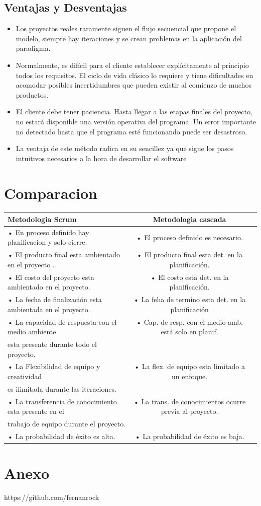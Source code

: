 \documentclass[10pt]{article}
\begin{document}
\subsection{Ventajas y Desventajas}
\begin{itemize}
\item 	Los proyectos reales raramente siguen el flujo secuencial que propone el modelo, siempre hay iteraciones y se crean problemas en la aplicación del paradigma.
\item 	Normalmente, es difícil para el cliente establecer explícitamente al principio  todos los requisitos. El ciclo de vida clásico lo requiere y tiene dificultades en acomodar posibles incertidumbres que pueden existir al comienzo de muchos productos.
\item 	El cliente debe tener paciencia. Hasta llegar a las etapas finales del proyecto, no estará disponible una versión operativa del programa. Un error importante no detectado hasta que el programa esté funcionando puede ser desastroso.
\item La ventaja de este método radica en su sencillez ya que sigue los pasos intuitivos necesarios a la hora de desarrollar el software
\end{itemize}




\newpage
\section{Comparacion}


\begin{tabular}{|lc|l|} \hline
\multicolumn{1}{|p{5cm}|}{\centering %
Metodologia Scrum} & \multicolumn{1}{|p{5cm}|}{\centering %
Metodologia cascada} \tabularnewline \hline
 • En proceso definido hay planificacion y solo cierre.   &  • El proceso definido es necesario.\\
 • El producto final esta ambientado en el proyecto . &  • El producto final esta det. en la planificación.\\
 • El costo del proyecto esta ambientado en el proyecto. & • El costo esta det. en la planificación. \\
 • La fecha de finalización esta ambientada en el proyecto. & • La feha de termino esta det. en la planificación \\
 • La capacidad de respuesta con el medio ambiente & • Cap. de resp. con el medio amb. está  solo en planif.\\
      esta presente durante todo el proyecto.\\
 • La Flexibilidad de equipo y creatividad  & • La flex. de equipo esta limitado a un enfoque.\\
     es ilimitada durante las iteraciones.\\
 • La transferencia de conocimiento esta presente en el &• La trans. de conocimientos ocurre previa al proyecto.\\
      trabajo de equipo durante el proyecto.\\
 • La probabilidad de éxito es alta. & • La probabilidad de éxito es baja.\\
 \hline
\end{tabular}




\section{Anexo}


https://github.com/fernanrock
\end{document}

